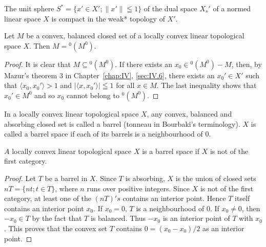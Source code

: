 \begin{corollaryu} The unit sphere $S^{*} = \{x' \in X'; \| x' \| \leqq 1\}$ of the dual space $X_{s}'$ of a normed linear space $X$ is compact in the weak* topology of $X'$. 
\end{corollaryu}


\begin{theorem}\label{thm:AV.1.Theorem.2} Let $M$ be a convex, balanced closed set of a locally convex linear topological space $X$. Then $M = {}^0 (M^0)$. 
\end{theorem}

\begin{proof}
 It is clear that $M \subseteq {}^0 (M^0)$. If there exists an $x_0 \in {}^0 (M^0) - M$, then, by Mazur's theorem $3$ in Chapter~\ref{chap:IV}, \ref{sec:IV.6}, there exists an $x_0' \in X'$ such that $\langle x_0, x_0' \rangle > 1$ and $|\langle x, x_0' \rangle| \leqq 1$ for all $x \in M$. The last inequality shows that $x_0' \in M^0$ and so $x_0$ cannot belong to ${}^0 (M^0)$. 
\end{proof}


\label{sec:AV.2}

\begin{definitionu} In a locally convex linear topological space $X$, any convex, balanced and absorbing closed set is called a barrel (tonneau in Bourbaki's terminology). $X$ is called a barrel space if each of its barrels is a neighbourhood of $0$. 
\end{definitionu}

\begin{theorem}\label{thm:AV.2.Theorem.1} $A$ locally convex linear topological space $X$ is a barrel space if $X$ is not of the first category. 
\end{theorem}

\begin{proof}
 Let $T$ be a barrel in $X$. Since $T$ is absorbing, $X$ is the union of closed sets $nT = \{nt; t \in T\}$, where $n$ runs over positive integers. Since $X$ is not of the first category, at least one of the $(nT)'s$ contains an interior point. Hence $T$ itself contains an interior point $x_{0}$. If $x_{0} = 0$, $T$ is a neighbourhood of $0$. If $x_{0} \neq 0$, then $-x_{0} \in T$ by the fact that $T$ is balanced. Thus $-x_{0}$ is an interior point of $T$ with $x_{0}$. This proves that the convex set $T$ contains $0 = (x_{0} - x_{0})/2$ as an interior point. 
\end{proof}

